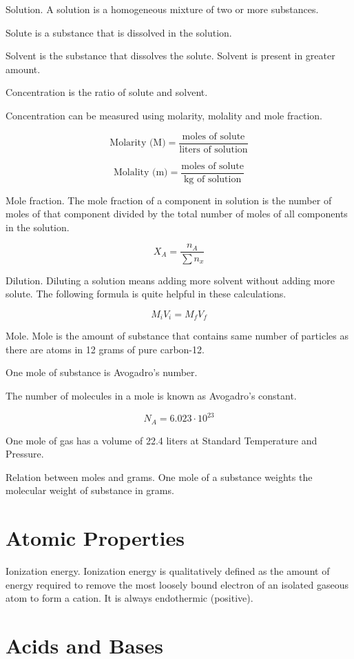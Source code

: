 \documentclass[oneside]{book} %
\theoremstyle{plain}
\begin{document}
Solution. A solution is a homogeneous mixture of two or more substances.

Solute is a substance that is dissolved in the solution.

Solvent is the substance that dissolves the solute. Solvent is present in
greater amount.

Concentration is the ratio of solute and solvent.

Concentration can be measured using molarity, molality and mole fraction.

\[\text{Molarity (M)} = \frac{\text{moles of solute}}{\text{liters of
solution}}\]

\[\text{Molality (m)} = \frac{\text{moles of solute}}{\text{kg of solution}}\]

Mole fraction. The mole fraction of a component in solution is the number of
moles of that component divided by the total number of moles of all components
in the solution.

\[X_A = \frac{n_A}{\sum{n_x}}\]

Dilution. Diluting a solution means adding more solvent without adding more
solute.
The following formula is quite helpful in these calculations.

\[M_i V_i = M_f V_f\]

Mole. Mole is the amount of substance that contains same number of particles as
there are atoms in 12 grams of pure carbon-12.

One mole of substance is Avogadro's number.

The number of molecules in a mole is known as Avogadro's constant.

\[N_A = 6.023 \cdot 10^{23}\]

One mole of gas has a volume of 22.4 liters at Standard Temperature and
Pressure.

Relation between moles and grams.
One mole of a substance weights the molecular weight of substance in grams.

\chapter{Atomic Properties}

Ionization energy. Ionization energy is qualitatively defined as the amount of
energy required to remove the most loosely bound electron of an isolated
gaseous atom to form a cation. It is always endothermic (positive).

\chapter{Acids and Bases}
\end{document}
